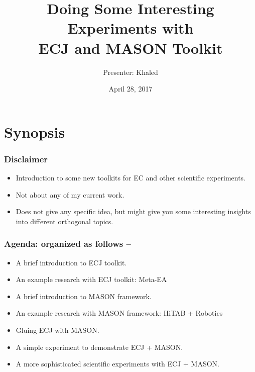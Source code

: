 \documentclass{beamer}
\title[MASON and ECJ]{Doing Some Interesting Experiments with\\ ECJ and MASON Toolkit} %
\author{Presenter: Khaled} %
\institute[COIN Laboratory, MSU] %
{
Computational Optimization and Innovation (COIN) Laboratory \\
Michigan State University \\ %
\medskip
\textit{talukde1@msu.edu} \\ %
}
\date{April 28, 2017}
\begin{document}
\begin{frame}
\titlepage %
\end{frame}



\section{Synopsis}	%
\begin{frame}
	\frametitle{Disclaimer}
	\begin{itemize}
		\item Introduction to some new toolkits for EC and other scientific experiments.
		\item Not about any of my current work.
		\item Does not give any specific idea, but might give you some interesting insights into different orthogonal topics.
	\end{itemize}
\end{frame}
\begin{frame}
	\frametitle{Agenda: organized as follows --}
	\begin{itemize}
		\item A brief introduction to ECJ toolkit.
		\item An example research with ECJ toolkit: Meta-EA
		\item A brief introduction to MASON framework.
		\item An example research with MASON framework: HiTAB + Robotics
		\item Gluing ECJ with MASON.
		\item A simple experiment to demonstrate ECJ + MASON.
		\item A more sophisticated scientific experiments with ECJ + MASON.
	\end{itemize}
\end{frame}
\end{document}
